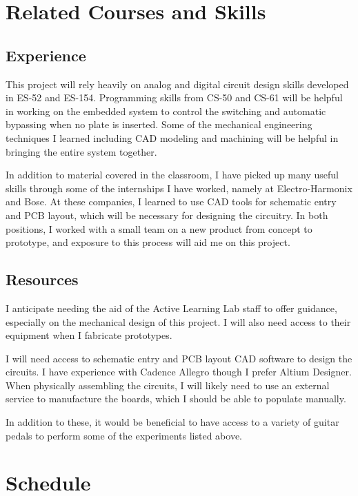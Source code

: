 \documentclass{article}
\begin{document}
\section{Related Courses and Skills}

\subsection{Experience}

This project will rely heavily on analog and digital circuit design skills developed in ES-52 and ES-154.  Programming skills from CS-50 and CS-61 will be helpful in working on the embedded system to control the switching and automatic bypassing when no plate is inserted.  Some of the mechanical engineering techniques I learned including CAD modeling and machining will be helpful in bringing the entire system together.

In addition to material covered in the classroom, I have picked up many useful skills through some of the internships I have worked, namely at Electro-Harmonix and Bose.  At these companies, I learned to use CAD tools for schematic entry and PCB layout, which will be necessary for designing the circuitry.  In both positions, I worked with a small team on a new product from concept to prototype, and exposure to this process will aid me on this project.

\subsection{Resources}

I anticipate needing the aid of the Active Learning Lab staff to offer guidance, especially on the mechanical design of this project.  I will also need access to their equipment when I fabricate prototypes.

I will need access to schematic entry and PCB layout CAD software to design the circuits.  I have experience with Cadence Allegro though I prefer Altium Designer.  When physically assembling the circuits, I will likely need to use an external service to manufacture the boards, which I should be able to populate manually.

In addition to these, it would be beneficial to have access to a variety of guitar pedals to perform some of the experiments listed above.

\section{Schedule}
\end{document}
